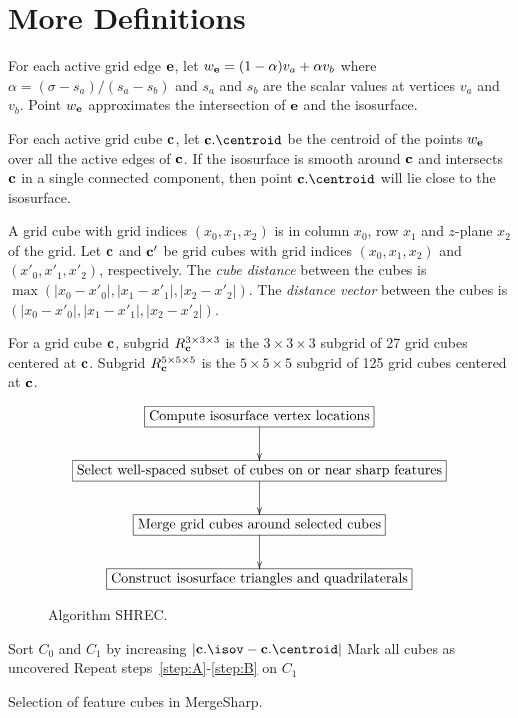 
\section{More Definitions}

For each active grid edge $\mathbf{e}$,
let $w_{\mathbf{e}} = (1-\alpha) v_a + \alpha v_b$
where $\alpha = (\sigma - s_a)/(s_a-s_b)$
and $s_a$ and $s_b$ are the scalar values at vertices $v_a$ and $v_b$.
Point $w_{\mathbf{e}}$ approximates the intersection of $\mathbf{e}$ and the isosurface.

For each active grid cube $\mathbf{c}$,
let $\cb.\centroid$ be the centroid of the points $w_{\mathbf{e}}$
over all the active edges of $\mathbf{c}$.
If the isosurface is smooth around $\mathbf{c}$
and intersects $\mathbf{c}$ in a single connected component,
then point $\cb.\centroid$ will lie close to the isosurface.

A grid cube with grid indices $(x_0,x_1,x_2)$ is in column $x_0$, row $x_1$
and $z$-plane $x_2$ of the grid.
Let $\mathbf{c}$ and $\mathbf{c}'$ be grid cubes with grid indices $(x_0,x_1,x_2)$
and $(x'_0,x'_1,x'_2)$, respectively.
The {\em cube distance} between the cubes 
is $\max(|x_0-x'_0|, |x_1-x'_1|, |x_2-x'_2|)$.
The {\em distance vector} between the cubes is
$(|x_0-x'_0|, |x_1-x'_1|, |x_2-x'_2|)$.

For a grid cube $\mathbf{c}$, 
subgrid $R^{3 \times 3 \times 3}_{\mathbf{c}}$ is the $3 \times 3 \times 3$ subgrid
of 27 grid cubes centered at $\mathbf{c}$.
Subgrid $R^{5 \times 5 \times 5}_{\mathbf{c}}$ is the $5 \times 5 \times 5$ subgrid
of 125 grid cubes centered at $\mathbf{c}$.


\begin{figure}
\begin{equation*}
\xymatrix{
\action{Compute isosurface vertex locations} \ar[d] \\
\action{Select well-spaced subset of cubes on or near sharp features} \ar[d] \\
\action{Merge grid cubes around selected cubes} \ar[d] \\
\action{Construct isosurface triangles and quadrilaterals}
}
\end{equation*}
\caption{Algorithm SHREC.}
\label{alg:shrec}
\end{figure}


\begin{algorithm}[t]
Sort $C_0$ and $C_1$ by increasing $|\cb.\isov-\cb.\centroid|$\;
Mark all cubes as uncovered\;
\label{step:B}
Repeat steps~\ref{step:A}-\ref{step:B} on $C_1$\;
\caption{Selection of feature cubes in MergeSharp.}
\label{alg:mergesharp_select}
\end{algorithm}


